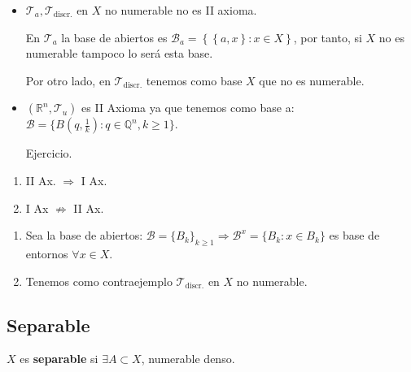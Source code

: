 \begin{ej}
\begin{itemize}
    \item $\mathcal{T}_a, \mathcal{T}_{\text{discr.}}$ en $X$ no numerable no es II axioma.
    \begin{demo}
        En $\mathcal{T}_a$ la base de abiertos es $\mathcal{B}_a = \left\{ \left\{ a, x \right\}: x \in X \right\}$, por tanto, si $X$ no es numerable
        tampoco lo será esta base.

        Por otro lado, en $\mathcal{T}_{\text{discr.}}$ tenemos como base $X$ que no es numerable.
    \end{demo}
    \item $\left( \mathbb{R}^n, \mathcal{T}_{u} \right)$ es II Axioma ya que tenemos como base a: $\mathcal{B} = \{B \left( q, \frac{1}{k}\right) : q \in \mathbb{Q}^n, k \ge 1 \}$.
    \begin{demo}
        Ejercicio.
    \end{demo}
\end{itemize}
\end{ej}

\begin{prop}
\begin{enumerate}
    \item II Ax. $\Rightarrow$ I Ax. 
    \item I Ax $\not \Rightarrow$ II Ax. 
\end{enumerate}
\end{prop}
\begin{demo}
\begin{enumerate}
    \item Sea la base de abiertos: $\mathcal{B} = \{B_k\}_{k \ge 1} \Rightarrow \mathcal{B}^x = \{B_k : x \in B_k\}$ es base de entornos $\forall x \in X$.
    \item Tenemos como contraejemplo $\mathcal{T}_{\text{discr.}}$ en $X$ no numerable.
\end{enumerate}
\end{demo}

\subsection{Separable}%
\label{sub:separable}
\begin{defi}[Separable]
$X$ es \textbf{separable} si $\exists A \subset X$, numerable denso.
\end{defi}

